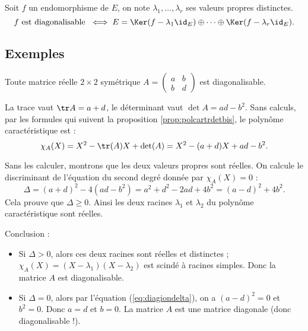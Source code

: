 \documentclass[12pt, class=report,crop=false]{standalone}
\begin{document}
\begin{corollaire}
Soit $f$ un endomorphisme de $E$, on note $\lambda_1,\ldots,\lambda_r$ ses valeurs propres distinctes.
\[f \text{ est diagonalisable } \iff E = \Ker (f -\lambda_1\id_E) \oplus \cdots \oplus \Ker (f-\lambda_r\id_E).\] 
\end{corollaire}

\subsection{Exemples}


\begin{exemple}
Toute matrice réelle $2 \times 2$ symétrique
$A = \left(\begin{array}{cc}
a & b \\
b & d
\end{array}\right)$
est diagonalisable. 

La trace vaut $\tr A = a+d$, le déterminant vaut $\det A = ad-b^2$.
Sans calculs, par les formules qui suivent la proposition \ref{prop:polcartrdetbis},
le polynôme caractéristique est :
$$\chi_A(X) = X^2 - \tr(A) X + \det(A) = X^2 - (a+d) X + ad-b^2.$$

Sans les calculer, montrons que les deux valeurs propres sont réelles.
On calcule le discriminant de l'équation du second degré donnée par $\chi_A(X)=0$ :
\begin{equation}
\label{eq:diagiondelta}
\Delta  = (a+d)^2 - 4(ad-b^2) = a^2+d^2 -2ad +4b^2 = (a-d)^2 + 4b^2.
\end{equation}
Cela prouve que $\Delta \ge 0$. Ainsi les deux racines $\lambda_1$ et $\lambda_2$ du polynôme caractéristique sont réelles.


Conclusion :
\begin{itemize}

  \item Si $\Delta > 0$, alors ces deux racines sont réelles et distinctes ; $\chi_A(X) = (X-\lambda_1)(X-\lambda_2)$ est scindé à racines simples. Donc la matrice $A$ est diagonalisable.
  
  \item Si $\Delta =0$, alors par l'équation (\ref{eq:diagiondelta}), on a $(a-d)^2 = 0$ et $b^2=0$. Donc
  $a=d$ et $b=0$. La matrice $A$ est une matrice diagonale (donc diagonalisable !).
\end{itemize}
\end{exemple}
\end{document}
